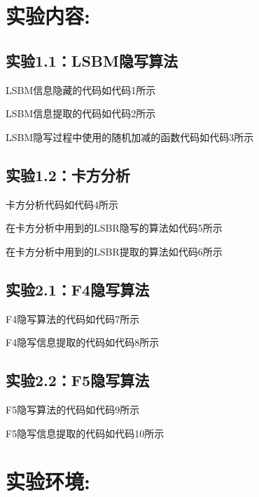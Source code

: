 \documentclass[a4paper,11pt,UTF8]{ctexart}
\begin{document}
\section{实验内容:}

  \subsection{实验1.1：LSBM隐写算法}
    LSBM信息隐藏的代码如代码1所示
     
    LSBM信息提取的代码如代码2所示
     
\newpage
    LSBM隐写过程中使用的随机加减的函数代码如代码3所示
     
    
  \subsection{实验1.2：卡方分析}
    卡方分析代码如代码4所示
     
    在卡方分析中用到的LSBR隐写的算法如代码5所示
     
    在卡方分析中用到的LSBR提取的算法如代码6所示
    

  \subsection{实验2.1：F4隐写算法}
    F4隐写算法的代码如代码7所示
    
    F4隐写信息提取的代码如代码8所示
    
\newpage
  \subsection{实验2.2：F5隐写算法}
    F5隐写算法的代码如代码9所示
    
    F5隐写信息提取的代码如代码10所示
    

\section{实验环境:}
\end{document}
